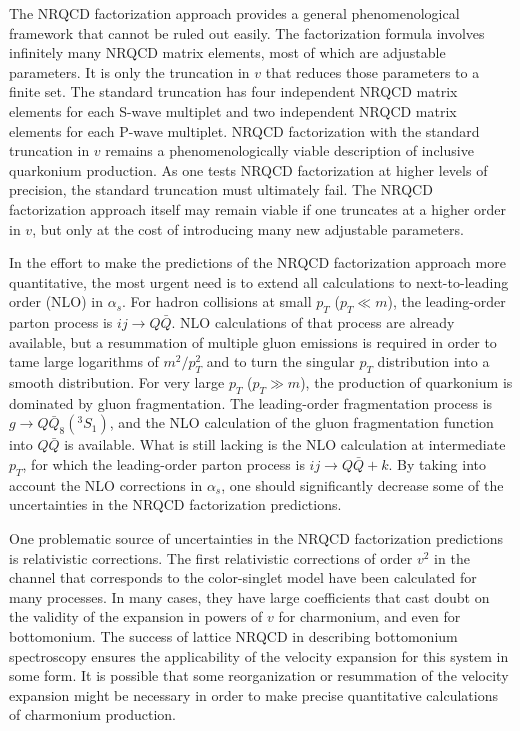 The NRQCD factorization approach provides a general phenomenological 
framework that cannot be ruled out easily.  The factorization 
formula involves infinitely many NRQCD matrix elements, most of which are 
adjustable parameters.  It is only the truncation in $v$ that reduces 
those parameters to a finite set. The standard truncation has 
four independent NRQCD matrix 
elements for each S-wave multiplet and two independent NRQCD matrix 
elements 
for each P-wave multiplet.  NRQCD factorization with the standard 
truncation in $v$ remains a phenomenologically viable description of 
inclusive quarkonium production.  As one tests NRQCD factorization at
higher levels of precision, the standard truncation must ultimately
fail. The NRQCD factorization approach itself may remain viable if one
truncates at a higher order in $v$, but only at the cost of
introducing many new adjustable parameters.

In the effort to make the predictions of the NRQCD factorization 
approach more quantitative, the most 
urgent need is to extend all calculations to next-to-leading order (NLO) in 
$\alpha_s$.  For hadron collisions at small $p_T$ ($p_T \ll m$), the 
leading-order parton process is $ij \to Q \bar Q$. NLO calculations of 
that process are 
already available, but a resummation of multiple gluon emissions is required 
in order to tame large logarithms of $m^2/p_T^2$ and 
to turn the singular $p_T$ distribution into a smooth distribution.  For 
very large $p_T$ ($p_T \gg m$), the production of quarkonium is dominated 
by gluon fragmentation.  The leading-order fragmentation process is 
$g \to Q \bar Q_8 ( ^3S_1 )$, and the NLO calculation of the gluon 
fragmentation function into $Q \bar Q$ is available.  What is still lacking 
is the NLO calculation at intermediate $p_T$, for which the 
leading-order parton process is $ij \to  Q \bar Q + k$.  By taking 
into account the NLO 
corrections in $\alpha_s$, one should significantly decrease some of the 
uncertainties in the NRQCD factorization predictions.

One problematic source of uncertainties in the NRQCD factorization 
predictions is relativistic corrections.  The first relativistic 
corrections of order $v^2$ in the channel that corresponds to the 
color-singlet model have been calculated for many processes.  In 
many cases, they have large coefficients that cast doubt on 
the validity of the 
expansion in powers of $v$ for charmonium, and even for bottomonium.  
The success of lattice NRQCD in describing bottomonium spectroscopy 
ensures the 
applicability of the velocity expansion for this system in some form.  It 
is possible that some reorganization or resummation of the velocity 
expansion might be necessary in order to make precise quantitative 
calculations of charmonium production.

